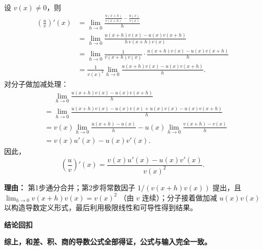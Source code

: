 \begin{proofbox}
\begin{description}[style=nextline, leftmargin=2.8em, labelsep=0.5em, itemsep=0.55em]
		\item[\textbf{步骤三（商证明）：}]
			设 $v(x)\neq 0$，则
			\[
				\begin{aligned}
					\left(\frac{u}{v}\right)'(x) &= \lim_{h\to 0}\frac{\frac{u(x+h)}{v(x+h)}-\frac{u(x)}{v(x)}}{h} \\
					&= \lim_{h\to 0}\frac{u(x+h)v(x)-u(x)v(x+h)}{h\,v(x+h)v(x)} \\
					&= \lim_{h\to 0}\frac{1}{v(x+h)v(x)}\cdot\frac{u(x+h)v(x)-u(x)v(x+h)}{h} \\
					&= \frac{1}{v(x)^2}\lim_{h\to 0}\frac{u(x+h)v(x)-u(x)v(x+h)}{h}.
			\end{aligned}
			\]
			对分子做加减处理：
			\[
				\begin{aligned}
					&\phantom{=}\lim_{h\to 0}\frac{u(x+h)v(x)-u(x)v(x+h)}{h} \\
					&= \lim_{h\to 0}\frac{u(x+h)v(x)-u(x)v(x)+u(x)v(x)-u(x)v(x+h)}{h} \\
					&= v(x)\lim_{h\to 0}\frac{u(x+h)-u(x)}{h} - u(x)\lim_{h\to 0}\frac{v(x+h)-v(x)}{h} \\
					&= v(x)u'(x) - u(x)v'(x).
			\end{aligned}
			\]
			因此，
			\[
				\left(\frac{u}{v}\right)'(x) = \frac{v(x)u'(x)-u(x)v'(x)}{v(x)^2}.
			\]
			\par\textbf{理由：}
			第1步通分合并；第2步将常数因子 $1/(v(x+h)v(x))$ 提出，且 $\lim_{h\to 0}v(x+h)v(x)=v(x)^2$ （由 $v$ 连续）；分子接着做加减 $u(x)v(x)$ 以构造导数定义形式，最后利用极限线性和可导性得到结果。
	\end{description}

	\medskip
	\textbf{\textcolor{CProof}{结论回扣}}

	\textbf{综上，和差、积、商的导数公式全部得证，公式与输入完全一致。}
\end{proofbox}
